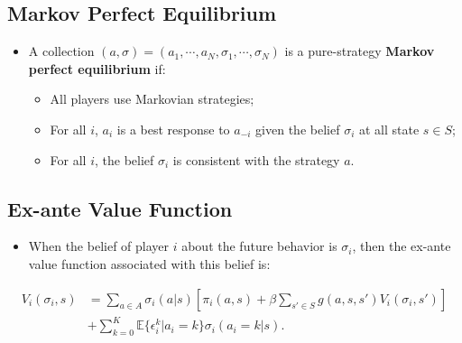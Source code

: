 \documentclass[]{book}
\providecommand{\tightlist}{%
  \setlength{\itemsep}{0pt}\setlength{\parskip}{0pt}}
\begin{document}
\subsection{Markov Perfect
Equilibrium}\label{markov-perfect-equilibrium}

\begin{itemize}
\tightlist
\item
  A collection
  \((a, \sigma) = (a_1, \cdots, a_N, \sigma_1, \cdots, \sigma_N)\) is a
  pure-strategy \textbf{Markov perfect equilibrium} if:

  \begin{itemize}
  \tightlist
  \item
    All players use Markovian strategies;
  \item
    For all \(i\), \(a_i\) is a best response to \(a_{-i}\) given the
    belief \(\sigma_i\) at all state \(s \in S\);
  \item
    For all \(i\), the belief \(\sigma_i\) is consistent with the
    strategy \(a\).
  \end{itemize}
\end{itemize}

\subsection{Ex-ante Value Function}\label{ex-ante-value-function}

\begin{itemize}
\tightlist
\item
  When the belief of player \(i\) about the future behavior is
  \(\sigma_i\), then the ex-ante value function associated with this
  belief is:
\end{itemize}

\begin{equation}
\begin{split}
V_i(\sigma_i, s) &= \sum_{a \in A} \sigma_i(a|s)[\pi_i(a, s) + \beta \sum_{s' \in S} g(a, s, s') V_i(\sigma_i, s')]\\
& + \sum_{k = 0}^K \mathbb{E}\{\epsilon_i^k|a_i = k\}\sigma_i(a_i = k|s).
\end{split}
\end{equation}
\end{document}
